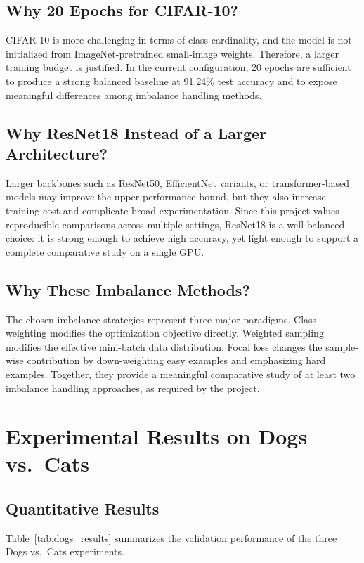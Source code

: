 \documentclass[11pt,a4paper]{article}
\begin{document}
\subsection{Why 20 Epochs for CIFAR-10?}
CIFAR-10 is more challenging in terms of class cardinality, and the model is not initialized from ImageNet-pretrained small-image weights. Therefore, a larger training budget is justified. In the current configuration, 20 epochs are sufficient to produce a strong balanced baseline at 91.24\% test accuracy and to expose meaningful differences among imbalance handling methods.

\subsection{Why ResNet18 Instead of a Larger Architecture?}
Larger backbones such as ResNet50, EfficientNet variants, or transformer-based models may improve the upper performance bound, but they also increase training cost and complicate broad experimentation. Since this project values reproducible comparisons across multiple settings, ResNet18 is a well-balanced choice: it is strong enough to achieve high accuracy, yet light enough to support a complete comparative study on a single GPU.

\subsection{Why These Imbalance Methods?}
The chosen imbalance strategies represent three major paradigms. Class weighting modifies the optimization objective directly. Weighted sampling modifies the effective mini-batch data distribution. Focal loss changes the sample-wise contribution by down-weighting easy examples and emphasizing hard examples. Together, they provide a meaningful comparative study of at least two imbalance handling approaches, as required by the project.

\section{Experimental Results on Dogs vs.\ Cats}

\subsection{Quantitative Results}
Table~\ref{tab:dogs_results} summarizes the validation performance of the three Dogs vs.\ Cats experiments.
\end{document}
